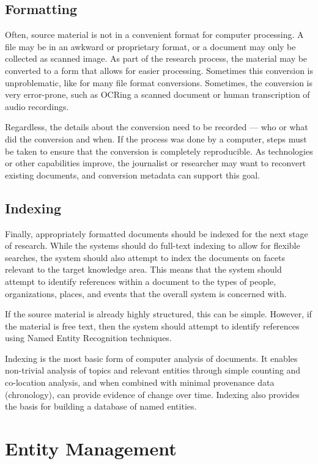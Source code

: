\documentclass[format=siggraph, review=true]{acmart}
\begin{document}
\subsection{Formatting}
Often, source material is not in a convenient format for computer
processing. A file may be in an awkward or proprietary format, or a
document may only be collected as scanned image. As part of the
research process, the material may be converted to a form that allows
for easier processing. Sometimes this conversion is unproblematic,
like for many file format conversions. Sometimes, the conversion is
very error-prone, such as OCRing a scanned document or human
transcription of audio recordings.

Regardless, the details about the conversion need to be recorded ---
who or what did the conversion and when. If the process was done by a
computer, steps must be taken to ensure that the conversion is
completely reproducible. As technologies or other capabilities
improve, the journalist or researcher may want to reconvert existing
documents, and conversion metadata can support this goal.

\subsection{Indexing}
Finally, appropriately formatted documents should be indexed for the
next stage of research. While the systems should do full-text indexing
to allow for flexible searches, the system should also attempt to
index the documents on facets relevant to the target knowledge
area. This means that the system should attempt to identify references
within a document to the types of people, organizations, places, and
events that the overall system is concerned with.

If the source material is already highly structured, this can be
simple. However, if the material is free text, then the system should
attempt to identify references using Named Entity Recognition
techniques. 

Indexing is the most basic form of computer analysis of documents. It
enables non-trivial analysis of topics and relevant entities through
simple counting and co-location analysis, and when combined with
minimal provenance data (chronology), can provide evidence of change
over time. Indexing also provides the basis for building a database
of named entities.

\section{Entity Management}
\end{document}
